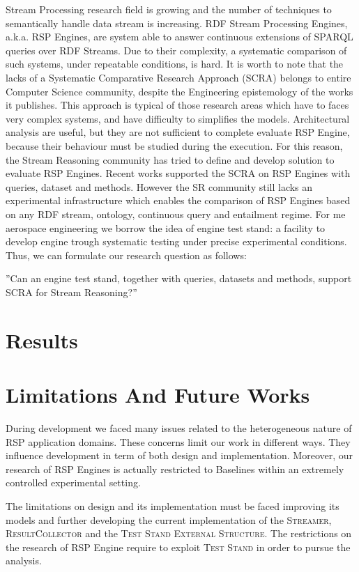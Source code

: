 Stream Processing research field is growing and the number of techniques to semantically handle data stream is increasing. RDF Stream Processing Engines, a.k.a. RSP Engines, are system able to answer continuous extensions of SPARQL queries over RDF Streams. Due to their complexity, a systematic comparison of such systems, under repeatable conditions, is hard. It is worth to note that the lacks of a Systematic Comparative Research Approach (SCRA) belongs to entire Computer Science community, despite the Engineering epistemology of the works it publishes. This approach is typical of those research areas which have to faces very complex systems, and have difficulty to simplifies the models. Architectural analysis are useful, but they are not sufficient to complete evaluate RSP Engine, because their behaviour must be studied during the execution. For this reason, the Stream Reasoning community has tried to define and develop solution to evaluate RSP Engines. Recent works supported the SCRA on RSP Engines with queries, dataset and methods. However the SR community still lacks an experimental infrastructure which enables the comparison of RSP Engines based on any RDF stream, ontology, continuous query and entailment regime.  For me aerospace engineering we borrow the idea of engine test stand: a facility to develop engine trough systematic testing under precise experimental conditions. Thus, we can formulate our research question as follows:

”Can an engine test stand, together with queries, datasets and methods, support SCRA for Stream Reasoning?”

\section{Results}

\section{Limitations And Future Works}

During \name development we faced many issues related to the heterogeneous nature of RSP application domains. These concerns limit our work in different ways. They influence  \name development in term of both design and implementation. Moreover, our research of RSP Engines  is actually restricted to \name Baselines within an extremely controlled experimental setting.

The limitations on \name design and its implementation must be faced improving its models and further developing the current implementation of the \textsc{Streamer}, \textsc{ResultCollector} and the \textsc{Test Stand External Structure}. The restrictions on the research of RSP Engine require to exploit \name \textsc{Test Stand} in order to pursue the analysis.


